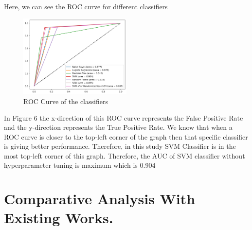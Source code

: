 \documentclass[conference]{IEEEtran}
\begin{document}
 Here, we can see the ROC curve for different classifiers

\begin{figure}[thpb]
\includegraphics[width=0.5\textwidth]{ROC.png}
\caption{ROC Curve of the classifiers}
\end{figure}

In Figure 6 the x-direction of this ROC curve represents the False Positive Rate and the y-direction represents the True Positive Rate. We know that when a ROC curve is closer to the top-left corner of the graph then that specific classifier is giving better performance. Therefore, in this study SVM Classifier is in the most top-left corner of this graph. Therefore, the AUC of SVM classifier without hyperparameter tuning is maximum which is 0.904 
\vspace{0.5cm}
\section{Comparative Analysis With Existing Works.}
\end{document}
